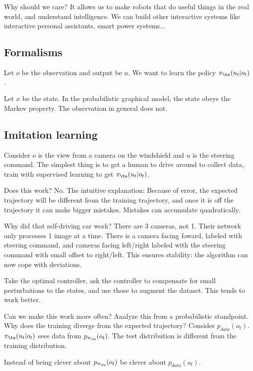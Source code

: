 Why should we care? It allows us to make robots that do useful things in the real world, and understand intelligence. We can build other interactive systems like interactive personal assistants, smart power systems...

\subsection{Formalisms}

Let $o$ be the observation and output be $u$. We want to learn the policy $\pi_\te(u_t|o_t)$.

Let $x$ be the state. In the probabilistic graphical model, the state obeys the Markov property. The observation in general does not.

\subsection{Imitation learning}

Consider $o$ is the view from a camera on the windshield and $u$ is the steering command.
The simplest thing is to get a human to drive around to collect data, train with supervised learning to get $\pi_\te(u_t|o_t)$.

Does this work? No. The intuitive explanation: 
Because of error, the expected trajectory will be different from the training trajectory, and once it is off the trajectory it can make bigger mistakes. Mistakes can accumulate quadratically.

Why did that self-driving car work? There are 3 cameras, not 1. Their network only processes 1 image at a time. There is a camera facing foward, labeled with steering command, and cameras facing left/right labeled with the steering command with small offset to right/left. This ensures stability: the algorithm can now cope with deviations.

Take the optimal controller, ask the controller to compensate for small perturbations to the states, and use those to augment the dataset. This tends to work better.

Can we make this work more often? Analyze this from a probabilistic standpoint. Why does the training diverge from the expected trajectory? Consider $p_{data}(o_t)$. $\pi_\te(u_t|o_t)$ sees data from $p_{\pi_\te}(o_t)$. The test distribution is different from the training distribution. 

Instead of being clever about $p_{\pi_\te}(o_t)$ be clever about $p_{data}(o_t)$.

